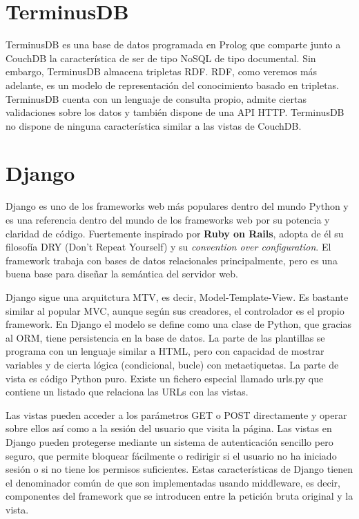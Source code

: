 \documentclass[12pt]{report} %
\begin{document}
\section{TerminusDB}
TerminusDB es una base de datos programada en Prolog que comparte junto a CouchDB la característica de ser de tipo NoSQL de tipo documental.\cite{terminusdb}
Sin embargo, TerminusDB almacena tripletas RDF. RDF, como veremos más adelante, es un modelo de representación del conocimiento basado en tripletas.
TerminusDB cuenta con un lenguaje de consulta propio, admite ciertas validaciones sobre los datos y también dispone de una API HTTP.
TerminusDB no dispone de ninguna característica similar a las vistas de CouchDB.


\section{Django}
Django es uno de los frameworks web más populares dentro del mundo Python y es una referencia dentro del mundo de los frameworks web por su potencia y claridad de código.\cite{django}
Fuertemente inspirado por \textbf{Ruby on Rails}, adopta de él su filosofía DRY (Don't Repeat Yourself) y su \textit{convention over configuration}.
El framework trabaja con bases de datos relacionales principalmente, pero es una buena base para diseñar la semántica del servidor web.

Django sigue una arquitctura MTV, es decir, Model-Template-View. Es bastante similar al popular MVC, aunque según sus creadores, el controlador es el propio framework.
En Django el modelo se define como una clase de Python, que gracias al ORM, tiene persistencia en la base de datos. La parte de las plantillas se programa con un lenguaje similar a HTML, pero con capacidad de mostrar variables
y de cierta lógica (condicional, bucle) con metaetiquetas. La parte de vista es código Python puro. Existe un fichero especial llamado urls.py que contiene un listado que relaciona las URLs con las vistas.

Las vistas pueden acceder a los parámetros GET o POST directamente y operar sobre ellos así como a la sesión del usuario que visita la página.
Las vistas en Django pueden protegerse mediante un sistema de autenticación sencillo pero seguro, que permite bloquear fácilmente o redirigir si el usuario no ha iniciado sesión o si no tiene los permisos suficientes.
Estas características de Django tienen el denominador común de que son implementadas usando middleware, es decir, componentes del framework que se introducen entre la petición bruta original
y la vista.
\end{document}

